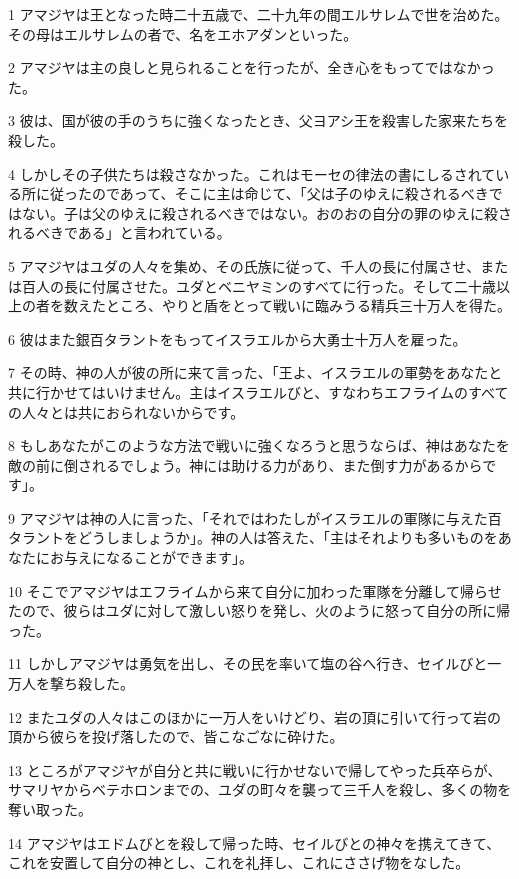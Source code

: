 \par 1 アマジヤは王となった時二十五歳で、二十九年の間エルサレムで世を治めた。その母はエルサレムの者で、名をエホアダンといった。
\par 2 アマジヤは主の良しと見られることを行ったが、全き心をもってではなかった。
\par 3 彼は、国が彼の手のうちに強くなったとき、父ヨアシ王を殺害した家来たちを殺した。
\par 4 しかしその子供たちは殺さなかった。これはモーセの律法の書にしるされている所に従ったのであって、そこに主は命じて、「父は子のゆえに殺されるべきではない。子は父のゆえに殺されるべきではない。おのおの自分の罪のゆえに殺されるべきである」と言われている。
\par 5 アマジヤはユダの人々を集め、その氏族に従って、千人の長に付属させ、または百人の長に付属させた。ユダとベニヤミンのすべてに行った。そして二十歳以上の者を数えたところ、やりと盾をとって戦いに臨みうる精兵三十万人を得た。
\par 6 彼はまた銀百タラントをもってイスラエルから大勇士十万人を雇った。
\par 7 その時、神の人が彼の所に来て言った、「王よ、イスラエルの軍勢をあなたと共に行かせてはいけません。主はイスラエルびと、すなわちエフライムのすべての人々とは共におられないからです。
\par 8 もしあなたがこのような方法で戦いに強くなろうと思うならば、神はあなたを敵の前に倒されるでしょう。神には助ける力があり、また倒す力があるからです」。
\par 9 アマジヤは神の人に言った、「それではわたしがイスラエルの軍隊に与えた百タラントをどうしましょうか」。神の人は答えた、「主はそれよりも多いものをあなたにお与えになることができます」。
\par 10 そこでアマジヤはエフライムから来て自分に加わった軍隊を分離して帰らせたので、彼らはユダに対して激しい怒りを発し、火のように怒って自分の所に帰った。
\par 11 しかしアマジヤは勇気を出し、その民を率いて塩の谷へ行き、セイルびと一万人を撃ち殺した。
\par 12 またユダの人々はこのほかに一万人をいけどり、岩の頂に引いて行って岩の頂から彼らを投げ落したので、皆こなごなに砕けた。
\par 13 ところがアマジヤが自分と共に戦いに行かせないで帰してやった兵卒らが、サマリヤからベテホロンまでの、ユダの町々を襲って三千人を殺し、多くの物を奪い取った。
\par 14 アマジヤはエドムびとを殺して帰った時、セイルびとの神々を携えてきて、これを安置して自分の神とし、これを礼拝し、これにささげ物をなした。
